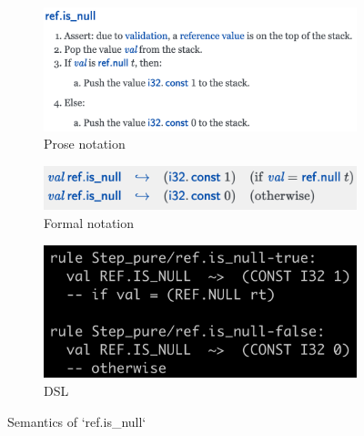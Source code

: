 \begin{figure}
  \centering
  \begin{subfigure}[b]{0.45\textwidth}
    \includegraphics[width=\textwidth]{img/prosespec1}
    \caption{Prose notation}
    \label{fig:prosespec1}
  \end{subfigure}
  \hfill
  \begin{subfigure}[b]{0.45\textwidth}
    \includegraphics[width=\textwidth]{img/formalspec1}
    \caption{Formal notation}
    \label{fig:formalspec1}
  \end{subfigure}
  \begin{subfigure}[b]{0.45\textwidth}
    \includegraphics[width=\textwidth]{img/dsl1}
    \caption{DSL}
    \label{fig:dsl1}
  \end{subfigure}

  \caption{Semantics of `ref.is\_null`}
  \label{fig:spec1}
\end{figure}

